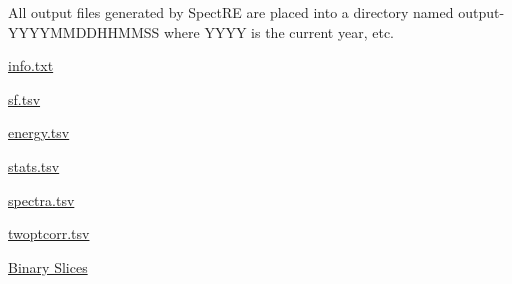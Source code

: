 All output files generated by SpectRE are placed into a directory named output-\/YYYYMMDDHHMMSS where YYYY is the current year, etc.

\begin{DoxyItemize}
\item \hyperlink{info_txt}{info.txt} \item \hyperlink{sf_tsv}{sf.tsv} \item \hyperlink{energy_tsv}{energy.tsv} \item \hyperlink{stats_tsv}{stats.tsv} \item \hyperlink{spectra_tsv}{spectra.tsv} \item \hyperlink{twoptcorr_tsv}{twoptcorr.tsv} \item \hyperlink{slices}{Binary Slices} \end{DoxyItemize}
